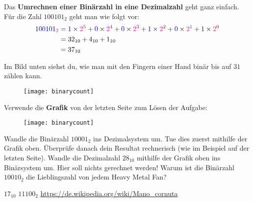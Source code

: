 Das \textbf{Umrechnen einer Binärzahl in eine Dezimalzahl} geht ganz einfach. Für die Zahl $100101_2$ geht man wie folgt vor:
\begin{align}\begin{split}
	\label{equ binaerzahl in basis und nennwerten}
	\textcolor{blue}{100101}_{\textcolor{magenta}{2}}
	&= \textcolor{blue}{1} \times \textcolor{magenta}{2}^{\textcolor{red}{5}}
	 + \textcolor{blue}{0} \times \textcolor{magenta}{2}^{\textcolor{red}{4}}
	 + \textcolor{blue}{0} \times \textcolor{magenta}{2}^{\textcolor{red}{3}}
	 + \textcolor{blue}{1} \times \textcolor{magenta}{2}^{\textcolor{red}{2}}
	 + \textcolor{blue}{0} \times \textcolor{magenta}{2}^{\textcolor{red}{1}}
	 + \textcolor{blue}{1} \times \textcolor{magenta}{2}^{\textcolor{red}{0}}
	\\
	&= 32_{10} + 4_{10} + 1_{10}
	\\
	&= 37_{10}		
\end{split}\end{align}


Im Bild unten siehst du, wie man mit den Fingern einer Hand binär bis auf $31$ zählen kann.
\begin{figure}[H]
	\centering
	\texttt{[image: binarycount]}
\end{figure}

\newpage

\begin{question}
	Verwende die \textbf{Grafik} von der letzten Seite zum Lösen der Aufgabe:
	\begin{figure}[H]
		\centering
		\texttt{[image: binarycount]}
	\end{figure}
	\begin{tasks}
		\task Wandle die Binärzahl $10001_2$ ins Dezimalsystem um. Tue dies zuerst mithilfe der Grafik oben. Überprüfe danach dein Resultat rechnerisch (wie im Beispiel auf der letzten Seite).
		\task Wandle die Dezimalzahl $28_{10}$ mithilfe der Grafik oben ins Binärsystem um. Hier soll nichts gerechnet werden!
		\task Warum ist die Binärzahl $10010_2$ die Lieblingszahl von jedem Heavy Metal Fan?
	\end{tasks}
\end{question}
\begin{solution}
	\begin{tasks}
		\task $17_{10}$
		\task $11100_2$
		\task \url{https://de.wikipedia.org/wiki/Mano_cornuta}
	\end{tasks}
\end{solution}

